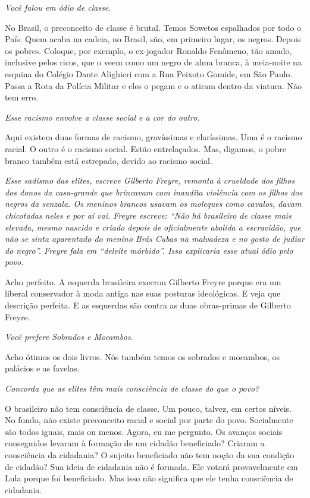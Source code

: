 \itshape
 Você falou em ódio de classe.

\normalfont 
No Brasil, o preconceito de classe é brutal. Temos
Sowetos espalhados por todo o País. Quem acaba na cadeia, no Brasil,
são, em primeiro lugar, os negros. Depois os pobres. Coloque, por
exemplo, o ex-jogador Ronaldo Fenômeno, tão amado, inclusive pelos
ricos, que o veem como um negro de alma branca, à meia-noite na esquina
do Colégio Dante Alighieri com a Rua Peixoto Gomide, em São Paulo. Passa
a Rota da Polícia Militar e eles o pegam e o atiram dentro da viatura.
Não tem erro.

\itshape
 Esse racismo envolve a classe social e a cor do outro.

\normalfont 
Aqui existem duas formas de racismo, gravíssimas e
claríssimas. Uma é o racismo racial. O outro é o racismo social. Estão
entrelaçados. Mas, digamos, o pobre branco também está estrepado, devido
ao racismo social.

\itshape
 Esse sadismo das elites, escreve Gilberto Freyre,
remonta à crueldade dos filhos dos donos da casa-grande que brincavam
com inaudita violência com os filhos dos negros da senzala. Os meninos
brancos usavam os moleques como cavalos, davam chicotadas neles e por aí
vai. Freyre escreve: ``Não há brasileiro de classe mais elevada, mesmo
nascido e criado depois de oficialmente abolida a escravidão, que não se
sinta aparentado do menino Brás Cubas na malvadeza e no gosto de judiar
do negro''. Freyre fala em ``deleite mórbido''. Isso explicaria esse
atual ódio pelo povo.

\normalfont 
Acho perfeito. A esquerda brasileira execrou Gilberto
Freyre porque era um liberal conservador à moda antiga nas suas posturas
ideológicas. E veja que descrição perfeita. E as esquerdas são contra as
duas obras-primas de Gilberto Freyre.

\itshape
 Você prefere \emph{Sobrados e Mocambos}.

\normalfont 
Acho ótimos os dois livros. Nós também temos os sobrados
e mocambos, os palácios e as favelas.

\itshape
 Concorda que as elites têm mais consciência de classe
do que o povo?

\normalfont 
O brasileiro não tem consciência de classe. Um pouco,
talvez, em certos níveis. No fundo, não existe preconceito racial e
social por parte do povo. Socialmente são todos iguais, mais ou menos.
Agora, eu me pergunto. Os avanços sociais conseguidos levaram à formação
de um cidadão beneficiado? Criaram a consciência da cidadania? O sujeito
beneficiado não tem noção da sua condição de cidadão? Sua ideia de
cidadania não é formada. Ele votará provavelmente em Lula porque foi
beneficiado. Mas isso não significa que ele tenha consciência de
cidadania.

